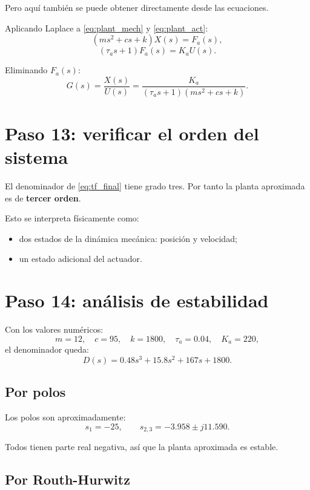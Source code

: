 \documentclass[11pt]{article}
\begin{document}
Pero aqu\'i tambi\'en se puede obtener directamente desde las ecuaciones.

Aplicando Laplace a \eqref{eq:plant_mech} y \eqref{eq:plant_act}:
\[
(ms^2+cs+k)X(s)=F_a(s),
\]
\[
(\tau_as+1)F_a(s)=K_aU(s).
\]

Eliminando $F_a(s)$:
\begin{equation}
G(s)=\frac{X(s)}{U(s)}
=
\frac{K_a}{(\tau_as+1)(ms^2+cs+k)}.
\label{eq:tf_final}
\end{equation}

\section{Paso 13: verificar el orden del sistema}

El denominador de \eqref{eq:tf_final} tiene grado tres. Por tanto la planta aproximada es de \textbf{tercer orden}.

Esto se interpreta f\'isicamente como:

\begin{itemize}[leftmargin=1.2cm]
\item dos estados de la din\'amica mec\'anica: posici\'on y velocidad;
\item un estado adicional del actuador.
\end{itemize}

\section{Paso 14: an\'alisis de estabilidad}

Con los valores num\'ericos:
\[
m=12,\quad c=95,\quad k=1800,\quad \tau_a=0.04,\quad K_a=220,
\]
el denominador queda:
\begin{equation}
D(s)=0.48s^3 + 15.8s^2 + 167s + 1800.
\end{equation}

\subsection{Por polos}

Los polos son aproximadamente:
\[
s_1=-25,\qquad
s_{2,3}=-3.958 \pm j11.590.
\]

Todos tienen parte real negativa, as\'i que la planta aproximada es estable.

\subsection{Por Routh-Hurwitz}
\end{document}
